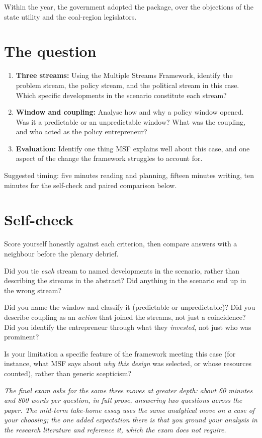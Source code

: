 \documentclass[nobib]{tufte-handout}
\begin{document}
Within the year, the government adopted the package, over the objections of the state utility and the coal-region legislators.

\section{The question}

\begin{enumerate}
\item[(a)] \textbf{Three streams:} Using the Multiple Streams Framework, identify the problem stream, the policy stream, and the political stream in this case. Which specific developments in the scenario constitute each stream?
\item[(b)] \textbf{Window and coupling:} Analyse how and why a policy window opened. Was it a predictable or an unpredictable window? What was the coupling, and who acted as the policy entrepreneur?
\item[(c)] \textbf{Evaluation:} Identify one thing MSF explains well about this case, and one aspect of the change the framework struggles to account for.
\end{enumerate}

Suggested timing: five minutes reading and planning, fifteen minutes writing, ten minutes for the self-check and paired comparison below.

\section{Self-check}

Score yourself honestly against each criterion, then compare answers with a neighbour before the plenary debrief.

\begin{description}\itemsep=3pt
\item[(a) Streams.] Did you tie \emph{each} stream to named developments in the scenario, rather than describing the streams in the abstract? Did anything in the scenario end up in the wrong stream?
\item[(b) Window.] Did you name the window and classify it (predictable or unpredictable)? Did you describe coupling as an \emph{action} that joined the streams, not just a coincidence? Did you identify the entrepreneur through what they \emph{invested}, not just who was prominent?
\item[(c) Evaluation.] Is your limitation a specific feature of the framework meeting this case (for instance, what MSF says about \emph{why this design} was selected, or whose resources counted), rather than generic scepticism?
\end{description}

\emph{The final exam asks for the same three moves at greater depth: about 60 minutes and 800 words per question, in full prose, answering two questions across the paper. The mid-term take-home essay uses the same analytical move on a case of your choosing; the one added expectation there is that you ground your analysis in the research literature and reference it, which the exam does not require.}
\end{document}
